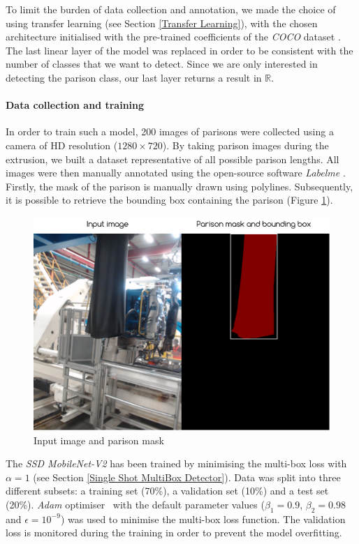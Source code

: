 To limit the burden of data collection and annotation, we made the choice of using transfer learning (see Section \ref{Transfer Learning}), with the chosen architecture initialised with the pre-trained coefficients of the \textit{COCO} dataset \citep{lin2014microsoft}. The last linear layer of the model was replaced in order to be consistent with the number of classes that we want to detect. Since we are only interested in detecting the parison class, our last layer returns a result in $\mathds{R}$. 

\paragraph{Data collection and training}

In order to train such a model, 200 images of parisons were collected using a camera of HD resolution ($1280\times720$). By taking parison images during the extrusion, we built a dataset representative of all possible parison lengths. All images were then manually annotated using the open-source software \textit{Labelme} \citep{wada2016labelme}. Firstly, the mask of the parison is manually drawn using polylines. Subsequently, it is possible to retrieve the bounding box containing the parison (Figure \ref{fig:input_and_label}).

\begin{figure}
\centerline{\includegraphics[scale=0.55]{images/chapter_3/input_and_label.png}}
\caption{Input image and parison mask}
\label{fig:input_and_label}
\end{figure}


The \textit{SSD MobileNet-V2} has been trained by minimising the multi-box loss with $\alpha = 1$ (see Section \ref{Single Shot MultiBox Detector}). Data was split into three different subsets: a training set (70\%), a validation set (10\%) and a test set (20\%). \textit{Adam} optimiser~\citep{kingma2014adam} with the default parameter values ($\beta_{1} = 0.9$, $\beta_{2} = 0.98$ and $\epsilon = 10^{-9}$) was used to minimise the multi-box loss function. The validation loss is monitored during the training in order to prevent the model overfitting.   

